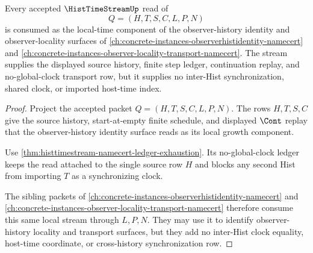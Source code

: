 \begin{theorem}
\label{thm:histtimestream-observer-locality-lattice-link}
Every accepted $\HistTimeStreamUp$ read of
$$
Q=(H,T,S,C,L,P,N)
$$
is consumed as the local-time component of the observer-history identity and observer-locality surfaces of \autoref{ch:concrete-instances-observerhistidentity-namecert} and \autoref{ch:concrete-instances-observer-locality-transport-namecert}. The stream supplies the displayed source history, finite step ledger, continuation replay, and no-global-clock transport row, but it supplies no inter-Hist synchronization, shared clock, or imported host-time index.
\end{theorem}
\begin{proof}
Project the accepted packet $Q=(H,T,S,C,L,P,N)$. The rows $H,T,S,C$ give the source history, start-at-empty finite schedule, and displayed $\Cont$ replay that the observer-history identity surface reads as its local growth component.

Use \autoref{thm:histtimestream-namecert-ledger-exhaustion}. Its no-global-clock ledger keeps the read attached to the single source row $H$ and blocks any second Hist from importing $T$ as a synchronizing clock.

The sibling packets of \autoref{ch:concrete-instances-observerhistidentity-namecert} and \autoref{ch:concrete-instances-observer-locality-transport-namecert} therefore consume this same local stream through $L,P,N$. They may use it to identify observer-history locality and transport surfaces, but they add no inter-Hist clock equality, host-time coordinate, or cross-history synchronization row.
\end{proof}

